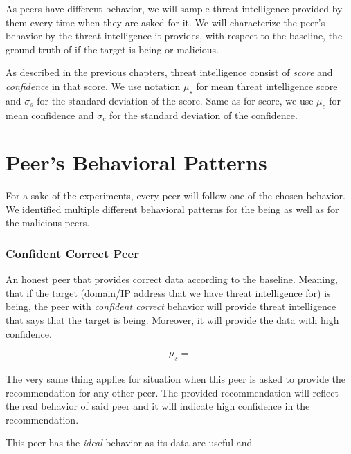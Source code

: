As peers have different behavior, we will sample threat intelligence provided by them every time when they are asked for it.
We will characterize the peer's behavior by the threat intelligence it provides, with respect to the baseline, the ground truth of if the target is being or malicious.

As described in the previous chapters, threat intelligence consist of \textit{score} and \textit{confidence} in that score.
We use notation $\mu_{s}$ for mean threat intelligence score and $\sigma_{s}$ for the standard deviation of the score. 
Same as for score, we use $\mu_{c}$ for mean confidence and $\sigma_{c}$ for the standard deviation of the confidence. 

\section{Peer's Behavioral Patterns}
\label{sec:peers-behavioral-patterns}
For a sake of the experiments, every peer will follow one of the chosen behavior. 
We identified multiple different behavioral patterns for the being as well as for the malicious peers.

\subsubsection{Confident Correct Peer}
An honest peer that provides correct data according to the baseline. Meaning, that if the target (domain/IP address that we have threat intelligence for) is being, the peer with \textit{confident correct} behavior will provide threat intelligence that says that the target is being. 
Moreover, it will provide the data with high confidence.

\begin{equation}
\begin{split}
    \mu_{s} = 
\end{split}
\end{equation}

The very same thing applies for situation when this peer is asked to provide the recommendation for any other peer. 
The provided recommendation will reflect the real behavior of said peer and it will indicate high confidence in the recommendation.

This peer has the \textit{ideal} behavior as its data are useful and 